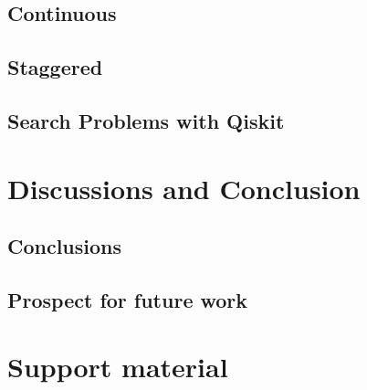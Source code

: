 \documentclass[
oneside,
11pt, a4paper,
footinclude=true,
headinclude=true,
cleardoublepage=empty
]{scrbook}
\begin{document}
\section{Continuous}

\section{Staggered}
\section{Search Problems with Qiskit}


\chapter{Discussions and Conclusion}
\section{Conclusions}
\section{Prospect for future work}










\chapter{Support material}
\end{document}
